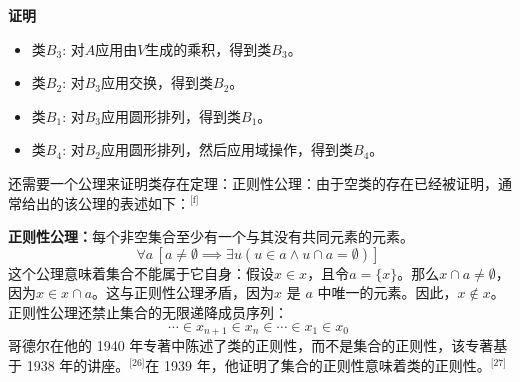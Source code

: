 \textbf{证明}
\begin{itemize}
\item 类\( B_3 \): 对\( A \)应用由\( V \)生成的乘积，得到类\( B_3 \)。
\item 类\( B_2 \): 对\( B_3 \)应用交换，得到类\( B_2 \)。
\item 类\( B_1 \): 对\( B_3 \)应用圆形排列，得到类\( B_1 \)。
\item 类\( B_4 \): 对\( B_2 \)应用圆形排列，然后应用域操作，得到类\( B_4 \)。
\end{itemize}
还需要一个公理来证明类存在定理：正则性公理：由于空类的存在已经被证明，通常给出的该公理的表述如下：\(^\text{[f]}\)

\textbf{正则性公理：}每个非空集合至少有一个与其没有共同元素的元素。  
\[
\forall a \, [a \neq \emptyset \implies \exists u (u \in a \land u \cap a = \emptyset)]~
\]
这个公理意味着集合不能属于它自身：假设\( x \in x \)，且令\( a = \{x\} \)。那么\( x \cap a \neq \emptyset \)，因为\( x \in x \cap a \)。这与正则性公理矛盾，因为\( x \) 是 \( a \) 中唯一的元素。因此，\( x \notin x \)。正则性公理还禁止集合的无限递降成员序列：  
\[
\cdots \in x_{n+1} \in x_{n} \in \cdots \in x_1 \in x_0~
\]
哥德尔在他的 1940 年专著中陈述了类的正则性，而不是集合的正则性，该专著基于 1938 年的讲座。\(^\text{[26]}\)在 1939 年，他证明了集合的正则性意味着类的正则性。\(^\text{[27]}\)
